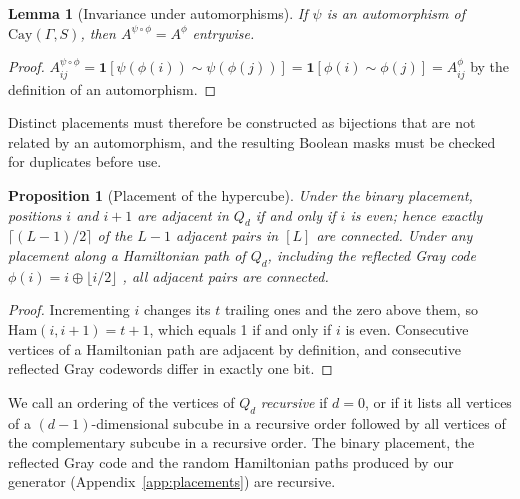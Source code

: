 \documentclass[10pt]{article}
\newtheorem{proposition}{Proposition}
\newtheorem{lemma}{Lemma}
\newcommand{\Cay}{\mathrm{Cay}}
\begin{document}
\begin{lemma}[Invariance under automorphisms]
\label{lem:aut}
If $\psi$ is an automorphism of $\Cay(\Gamma,S)$, then $A^{\psi\circ\phi}=A^\phi$ entrywise.
\end{lemma}
\begin{proof}
$A^{\psi\circ\phi}_{ij}=\mathbf 1[\psi(\phi(i))\sim\psi(\phi(j))]=\mathbf 1[\phi(i)\sim\phi(j)]=A^\phi_{ij}$ by the definition of an automorphism.
\end{proof}

Distinct placements must therefore be constructed as bijections that are not related by an automorphism, and the resulting Boolean masks must be checked for duplicates before use.

\begin{proposition}[Placement of the hypercube]
\label{prop:gray}
Under the binary placement, positions $i$ and $i+1$ are adjacent in $Q_d$ if and only if $i$ is even; hence exactly $\lceil(L-1)/2\rceil$ of the $L-1$ adjacent pairs in $[L]$ are connected. Under any placement along a Hamiltonian path of $Q_d$, including the reflected Gray code $\phi(i)=i\oplus\lfloor i/2\rfloor$ \citep{gray1953pulse}, all adjacent pairs are connected.
\end{proposition}
\begin{proof}
Incrementing $i$ changes its $t$ trailing ones and the zero above them, so $\mathrm{Ham}(i,i+1)=t+1$, which equals 1 if and only if $i$ is even. Consecutive vertices of a Hamiltonian path are adjacent by definition, and consecutive reflected Gray codewords differ in exactly one bit.
\end{proof}

We call an ordering of the vertices of $Q_d$ \emph{recursive} if $d=0$, or if it lists all vertices of a $(d-1)$-dimensional subcube in a recursive order followed by all vertices of the complementary subcube in a recursive order. The binary placement, the reflected Gray code and the random Hamiltonian paths produced by our generator (Appendix~\ref{app:placements}) are recursive.
\end{document}
